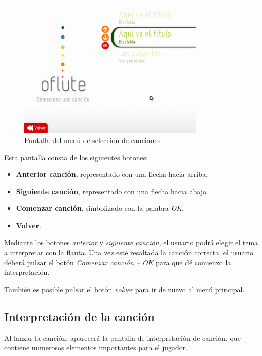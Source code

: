 \begin{figure}[h!]
  \centering
  \includegraphics[width=0.8\textwidth]{apendice_manual_usuario/imagen_seccionCanciones1}
  \caption{Pantalla del menú de selección de canciones}
\end{figure}

Esta pantalla consta de los siguientes botones:
\begin{itemize}
\item \textbf{Anterior canción}, representado con una flecha hacia arriba.
\item \textbf{Siguiente canción}, representado con una flecha hacia abajo.
\item \textbf{Comenzar canción}, simbolizado con la palabra \textit{OK}.
\item \textbf{Volver}.
\end{itemize}

Mediante los botones \textit{anterior} y \textit{siguiente canción}, el usuario
podrá elegir el tema a interpretar con la flauta. Una vez esté resaltada la
canción correcta, el usuario deberá pulsar el botón \textit{Comenzar canción --
  OK} para que dé comienzo la interpretación.

También es posible pulsar el botón \textit{volver} para ir de nuevo al menú
principal.

\subsection{Interpretación de la canción}

Al lanzar la canción, aparecerá la pantalla de interpretación de canción, que
contiene numerosos elementos importantes para el jugador.

